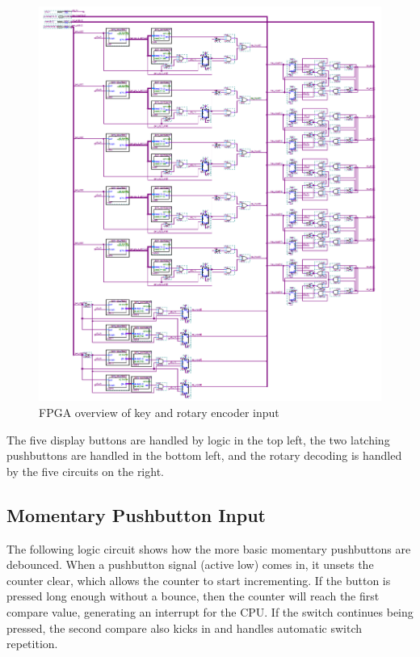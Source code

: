 \begin{figure}[ht!]
    \centering
    \includegraphics[width=6in]{fpga_logic/keys_overview.png}
		\caption{FPGA overview of key and rotary encoder input}
\end{figure}

The five display buttons are handled by logic in the top left, the two latching pushbuttons are handled in the bottom left, and the rotary decoding is handled by the five circuits on the right.

\subsection{Momentary Pushbutton Input}

The following logic circuit shows how the more basic momentary pushbuttons are debounced. When a pushbutton signal (active low) comes in, it unsets the counter clear, which allows the counter to start incrementing. If the button is pressed long enough without a bounce, then the counter will reach the first compare value, generating an interrupt for the CPU. If the switch continues being pressed, the second compare also kicks in and handles automatic switch repetition.

